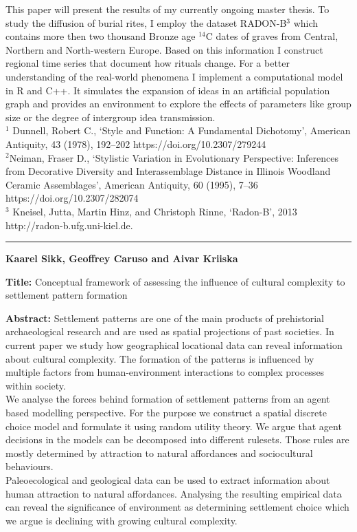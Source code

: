 \documentclass[]{article}
\begin{document}
This paper will present the results of my
currently ongoing master thesis. To study the diffusion of burial rites,
I employ the dataset RADON-B$^3$ which contains more then two thousand
Bronze age $^{14}$C dates of graves from Central, Northern and
North-western Europe. Based on this information I construct regional
time series that document how rituals change. For a better understanding
of the real-world phenomena I implement a computational model in R and
C++. It simulates the expansion of ideas in an artificial population
graph and provides an environment to explore the effects of parameters
like group size or the degree of intergroup idea transmission.
\\[2\baselineskip]$^1$
Dunnell, Robert C., ‘Style and Function: A Fundamental Dichotomy’, American Antiquity, 43 (1978), 192–202 https://doi.org/10.2307/279244 \\

$^2$Neiman, Fraser D., ‘Stylistic Variation in Evolutionary Perspective: Inferences from Decorative Diversity and Interassemblage Distance in Illinois Woodland Ceramic Assemblages’, American Antiquity, 60 (1995), 7–36 https://doi.org/10.2307/282074 \\

$^3$
Kneisel, Jutta, Martin Hinz, and Christoph Rinne, ‘Radon-B’, 2013 http://radon-b.ufg.uni-kiel.de. \\


\rule{4cm}{.4pt}


{\bf {Kaarel Sikk, Geoffrey Caruso and Aivar Kriiska}}

\textbf{Title:} Conceptual framework of assessing the influence of
cultural complexity to settlement pattern formation

\textbf{Abstract:} Settlement patterns are one of the main products of
prehistorial archaeological research and are used as spatial projections
of past societies. In current paper we study how geographical locational
data can reveal information about cultural complexity. The formation of
the patterns is influenced by multiple factors from human-environment
interactions to complex processes within society.\\
We analyse the forces behind formation of settlement patterns from an
agent based modelling perspective. For the purpose we construct a
spatial discrete choice model and formulate it using random utility
theory. We argue that agent decisions in the models can be decomposed
into different rulesets. Those rules are mostly determined by attraction
to natural affordances and sociocultural behaviours.\\
Paleoecological and geological data can be used to extract information
about human attraction to natural affordances. Analysing the resulting
empirical data can reveal the significance of environment as determining
settlement choice which we argue is declining with growing cultural
complexity.\\
\end{document}
